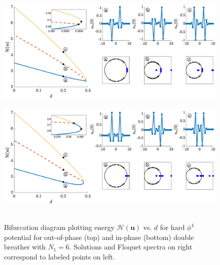 \documentclass[12pt,reqno]{amsart}
\newcommand{\uvec}{\mathbf{u}}
\theoremstyle{definition}
\begin{document}
\begin{figure}
	\hbox{
	\hspace{-2cm}
	\includegraphics[width=20cm]{bifdiagphi4oppositeN6.eps}
	}
	\hbox{
	\hspace{-2cm}
	\includegraphics[width=20cm]{bifdiagphi4inphaseN6.eps}
	}
	\caption{Bifurcation diagram plotting energy $\mathcal{H}(\uvec)$ vs. $d$ for hard $\phi^4$ potential for out-of-phase (top) and in-phase (bottom) double breather with $N_1 = 6$. Solutions and Floquet spectra on right correspond to labeled points on left.}
	\label{fig:bifdiagphi4}
\end{figure}
\end{document}
